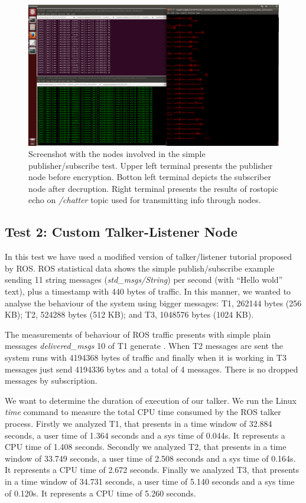 \documentclass[journal,twoside]{JoPhA}
\begin{document}
\begin{figure}[ht!]
	\centering
	\includegraphics[width=.99\textwidth]{Screenshot_hello_world.png}
	\caption{Screenshot with the nodes involved in the simple publisher/subscribe test. Upper left terminal presents the publisher node before encryption. Botton left terminal depicts the subscriber node after decruption. Right terminal presents the results of rostopic echo on {\em /chatter} topic used for transmitting info through nodes.}
	\label{fig:screenshot_hello_world}
\end{figure}

\subsection{Test 2: Custom Talker-Listener Node}


In this test we have used a modified version of talker/listener tutorial proposed by ROS. 
ROS statistical data shows the simple publish/subscribe example sending 11 string messages ({\em std\_msgs/String}) per second (with ``Hello wold'' text), plus a timestamp with 440 bytes of traffic.
In this manner, we wanted to analyse the behaviour of the system using bigger messages: T1, 262144 bytes (256 KB); T2, 524288 bytes (512 KB); and T3, 1048576 bytes (1024 KB).

The measurements of behaviour of ROS traffic presents with simple plain messages {\em delivered\_msgs} 10 of T1 generate . When T2 messages are sent the system runs with 4194368 bytes of traffic and finally when it is working in  T3 messages just send 4194336 bytes and a total of 4 messages. There is no dropped messages by subscription.

We want to determine the duration of execution of our talker. We run the Linux {\em time} command to measure the total CPU time consumed by the ROS talker process. 
Firstly we analyzed T1, that presents in a time window of 32.884 seconds, a user time of  1.364 seconds and a sys time of 0.044s. It represents a CPU time of 1.408 seconds.
Secondly we analyzed T2, that presents in a time window of 33.749 seconds, a user time of  2.508 seconds and a sys time of 0.164s. It represents a CPU time of 2.672 seconds.
Finally we analyzed T3, that presents in a time window of 34.731 seconds, a user time of  5.140 seconds and a sys time of 0.120s. It represents a CPU time of 5.260 seconds.
\end{document}
